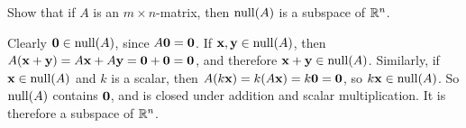 \begin{enumialphparenastyle}
\begin{ex}
  Show that if $A$ is an $m\times n$-matrix, then $\nullspace(A)$
  is a subspace of $\mathbb{R}^n$.
  \begin{sol}
    Clearly $\vect{0}\in\nullspace(A)$, since $A\mbox{\bf 0}=\mbox{\bf 0}$.
    If $\vect{x},\vect{y}\in\nullspace(A)$, then
    $A(\mbox{\bf x}+\mbox{\bf y}) = A\mbox{\bf x}+A\mbox{\bf y} = \mbox{\bf 0}
    +\mbox{\bf 0}=\mbox{\bf 0}$, and therefore
    $\vect{x}+\vect{y}\in\nullspace(A)$. Similarly, if
    $\vect{x}\in\nullspace(A)$ and $k$ is a scalar, then
    $A(k\mbox{\bf x})=k(A\mbox{\bf x})=k\mbox{\bf 0}=\mbox{\bf 0}$, so
    $k\vect{x}\in\nullspace(A)$. So $\nullspace(A)$ contains
    $\mbox{\bf 0}$, and is closed under addition and scalar
    multiplication. It is therefore a subspace of $\mathbb{R}^n$. 
  \end{sol}
\end{ex}


\end{enumialphparenastyle}
